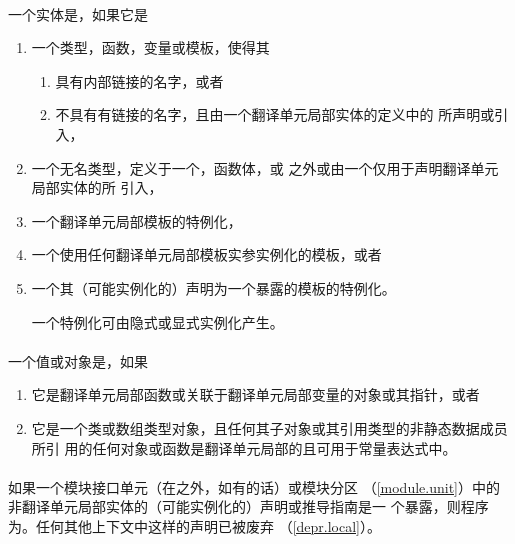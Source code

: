 \paragraph{} %
一个实体是，如果它是
\begin{enumerate}
  \item 一个类型，函数，变量或模板，使得其
        \begin{enumerate}
          \item 具有内部链接的名字，或者
          \item 不具有有链接的名字，且由一个翻译单元局部实体的定义中的
                所声明或引入，
        \end{enumerate}
  \item 一个无名类型，定义于一个，函数体，或
        之外或由一个仅用于声明翻译单元局部实体的所
        引入，
  \item 一个翻译单元局部模板的特例化，
  \item 一个使用任何翻译单元局部模板实参实例化的模板，或者
  \item 一个其（可能实例化的）声明为一个暴露的模板的特例化。

        \begin{note}
          一个特例化可由隐式或显式实例化产生。
        \end{note}
\end{enumerate}

\paragraph{} %
一个值或对象是，如果
\begin{enumerate}
  \item 它是翻译单元局部函数或关联于翻译单元局部变量的对象或其指针，或者
  \item 它是一个类或数组类型对象，且任何其子对象或其引用类型的非静态数据成员所引
        用的任何对象或函数是翻译单元局部的且可用于常量表达式中。
\end{enumerate}

\paragraph{} %
如果一个模块接口单元（在之外，如有的话）或模块分区
（\ref{module.unit}）中的非翻译单元局部实体的（可能实例化的）声明或推导指南是一
个暴露，则程序为\illform{}。任何其他上下文中这样的声明已被废弃
（\ref{depr.local}）。

